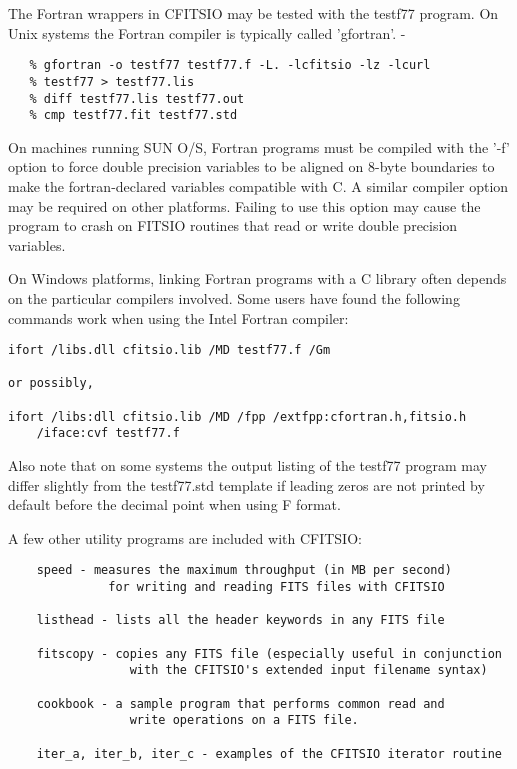 \documentclass[11pt]{book}
\begin{document}
The Fortran wrappers in CFITSIO may be tested with the testf77
program.  On Unix systems the Fortran compiler is typically
called 'gfortran'.
-

\begin{verbatim}
   % gfortran -o testf77 testf77.f -L. -lcfitsio -lz -lcurl
   % testf77 > testf77.lis
   % diff testf77.lis testf77.out
   % cmp testf77.fit testf77.std
\end{verbatim}
On machines running SUN O/S, Fortran programs must be compiled with the
'-f' option to force double precision variables to be aligned on 8-byte
boundaries to make the fortran-declared variables compatible with C.  A
similar compiler option may be required on other platforms.  Failing to
use this option may cause the program to crash on FITSIO routines that
read or write double precision variables.

On Windows platforms, linking Fortran programs with a C library
often depends on the particular compilers involved.  Some users have
found the following commands work when using the Intel Fortran compiler:

\begin{verbatim}
ifort /libs.dll cfitsio.lib /MD testf77.f /Gm

or possibly,

ifort /libs:dll cfitsio.lib /MD /fpp /extfpp:cfortran.h,fitsio.h
    /iface:cvf testf77.f
\end{verbatim}
Also note that on some systems the output listing of the testf77
program may differ slightly from the testf77.std template if leading
zeros are not printed by default before the decimal point when using F
format.

A few other utility  programs are included with CFITSIO:

\begin{verbatim}
    speed - measures the maximum throughput (in MB per second)
              for writing and reading FITS files with CFITSIO

    listhead - lists all the header keywords in any FITS file

    fitscopy - copies any FITS file (especially useful in conjunction
                 with the CFITSIO's extended input filename syntax)

    cookbook - a sample program that performs common read and
                 write operations on a FITS file.

    iter_a, iter_b, iter_c - examples of the CFITSIO iterator routine
\end{verbatim}
\end{document}
